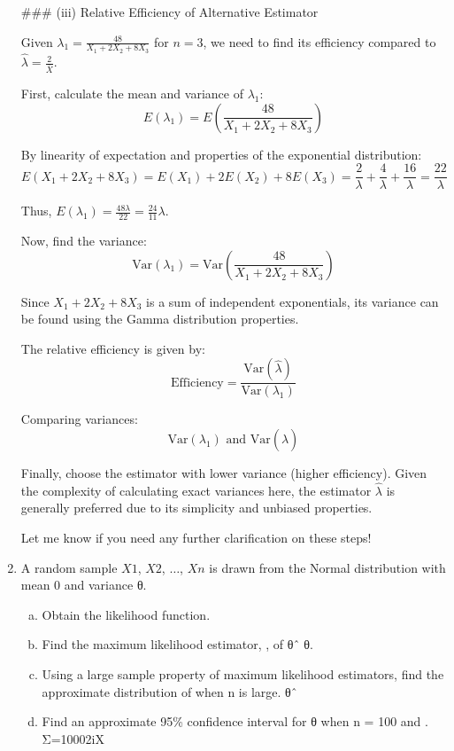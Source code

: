 \begin{enumerate}
### (iii) Relative Efficiency of Alternative Estimator

Given \( \lambda_1 = \frac{48}{X_1 + 2X_2 + 8X_3} \) for \( n = 3 \), we need to find its efficiency compared to \( \hat{\lambda} = \frac{2}{\bar{X}} \).

First, calculate the mean and variance of \( \lambda_1 \):
\[ E(\lambda_1) = E\left(\frac{48}{X_1 + 2X_2 + 8X_3}\right) \]

By linearity of expectation and properties of the exponential distribution:
\[ E(X_1 + 2X_2 + 8X_3) = E(X_1) + 2E(X_2) + 8E(X_3) = \frac{2}{\lambda} + \frac{4}{\lambda} + \frac{16}{\lambda} = \frac{22}{\lambda} \]

Thus, \( E(\lambda_1) = \frac{48\lambda}{22} = \frac{24}{11} \lambda \).

Now, find the variance:
\[ \text{Var}(\lambda_1) = \text{Var}\left(\frac{48}{X_1 + 2X_2 + 8X_3}\right) \]

Since \( X_1 + 2X_2 + 8X_3 \) is a sum of independent exponentials, its variance can be found using the Gamma distribution properties.

The relative efficiency is given by:
\[ \text{Efficiency} = \frac{\text{Var}(\hat{\lambda})}{\text{Var}(\lambda_1)} \]

Comparing variances:
\[ \text{Var}(\lambda_1) \text{ and } \text{Var}(\hat{\lambda}) \]

Finally, choose the estimator with lower variance (higher efficiency). Given the complexity of calculating exact variances here, the estimator \( \hat{\lambda} \) is generally preferred due to its simplicity and unbiased properties.

Let me know if you need any further clarification on these steps!

\item  A random sample $X1$, $X2$, $\ldots$, $Xn$ is drawn from the Normal distribution with mean 0 and variance θ.
\begin{enumerate}[(a)]
\item Obtain the likelihood function.
\item Find the maximum likelihood estimator, , of θˆ θ.
\item  Using a large sample property of maximum likelihood estimators, find the approximate distribution of when n is large. θˆ
\item Find an approximate 95\% confidence interval for θ when n = 100 and . Σ=10002iX
\end{enumerate}

\end{enumerate}
